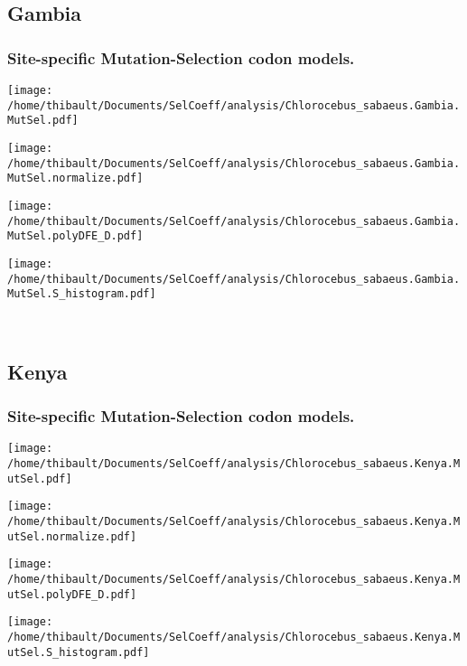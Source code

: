 \subsection{Gambia} 
 
\subsubsection*{Site-specific Mutation-Selection codon models.} 
\begin{minipage}{0.49\linewidth} 
\texttt{[image: /home/thibault/Documents/SelCoeff/analysis/Chlorocebus\_sabaeus.Gambia.MutSel.pdf]} 
\end{minipage}
\begin{minipage}{0.49\linewidth} 
\texttt{[image: /home/thibault/Documents/SelCoeff/analysis/Chlorocebus\_sabaeus.Gambia.MutSel.normalize.pdf]} 
\end{minipage}
\begin{minipage}{0.49\linewidth} 
\texttt{[image: /home/thibault/Documents/SelCoeff/analysis/Chlorocebus\_sabaeus.Gambia.MutSel.polyDFE\_D.pdf]} 
\end{minipage}
\begin{minipage}{0.49\linewidth} 
\texttt{[image: /home/thibault/Documents/SelCoeff/analysis/Chlorocebus\_sabaeus.Gambia.MutSel.S\_histogram.pdf]} 
\end{minipage}
\\ 
\subsection{Kenya} 
 
\subsubsection*{Site-specific Mutation-Selection codon models.} 
\begin{minipage}{0.49\linewidth} 
\texttt{[image: /home/thibault/Documents/SelCoeff/analysis/Chlorocebus\_sabaeus.Kenya.MutSel.pdf]} 
\end{minipage}
\begin{minipage}{0.49\linewidth} 
\texttt{[image: /home/thibault/Documents/SelCoeff/analysis/Chlorocebus\_sabaeus.Kenya.MutSel.normalize.pdf]} 
\end{minipage}
\begin{minipage}{0.49\linewidth} 
\texttt{[image: /home/thibault/Documents/SelCoeff/analysis/Chlorocebus\_sabaeus.Kenya.MutSel.polyDFE\_D.pdf]} 
\end{minipage}
\begin{minipage}{0.49\linewidth} 
\texttt{[image: /home/thibault/Documents/SelCoeff/analysis/Chlorocebus\_sabaeus.Kenya.MutSel.S\_histogram.pdf]} 
\end{minipage}
\\ 
